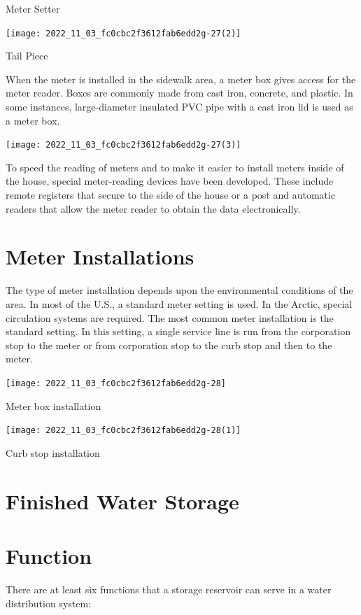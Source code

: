 \documentclass[10pt]{article}
\begin{document}
Meter Setter

\texttt{[image: 2022\_11\_03\_fc0cbc2f3612fab6edd2g-27(2)]}

Tail Piece

When the meter is installed in the sidewalk area, a meter box gives access for the meter reader. Boxes are commonly made from cast iron, concrete, and plastic. In some instances, large-diameter insulated PVC pipe with a cast iron lid is used as a meter box.

\texttt{[image: 2022\_11\_03\_fc0cbc2f3612fab6edd2g-27(3)]}

To speed the reading of meters and to make it easier to install meters inside of the house, special meter-reading devices have been developed. These include remote registers that secure to the side of the house or a post and automatic readers that allow the meter reader to obtain the data electronically.

\section{Meter Installations}
The type of meter installation depends upon the environmental conditions of the area. In most of the U.S., a standard meter setting is used. In the Arctic, special circulation systems are required. The most common meter installation is the standard setting. In this setting, a single service line is run from the corporation stop to the meter or from corporation stop to the curb stop and then to the meter.

\texttt{[image: 2022\_11\_03\_fc0cbc2f3612fab6edd2g-28]}

Meter box installation

\texttt{[image: 2022\_11\_03\_fc0cbc2f3612fab6edd2g-28(1)]}

Curb stop installation

\section{Finished Water Storage}
\section{Function}
There are at least six functions that a storage reservoir can serve in a water distribution system:
\end{document}
